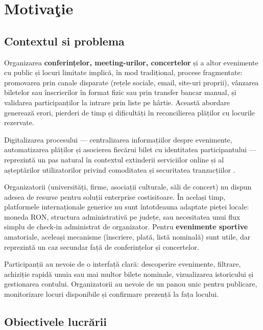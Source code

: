 \chapter{Motiva\c tie}



\section{Contextul si problema}

Organizarea \textbf{conferințelor, meeting-urilor, concertelor} și a altor evenimente cu public și locuri limitate implică, în mod tradițional, procese fragmentate: promovarea prin canale disparate (rețele sociale, email, site-uri proprii), vânzarea biletelor sau înscrierilor în format fizic sau prin transfer bancar manual, și validarea participanților la intrare prin liste pe hârtie. Această abordare generează erori, pierderi de timp și dificultăți în reconcilierea plăților cu locurile rezervate.

Digitalizarea procesului — centralizarea informațiilor despre evenimente, automatizarea plăților și asocierea fiecărui bilet cu identitatea participantului — reprezintă un pas natural în contextul extinderii serviciilor online și al așteptărilor utilizatorilor privind comoditatea și securitatea tranzacțiilor \cite{fielding2000, stripe2024}.

Organizatorii (universități, firme, asociații culturale, săli de concert) nu dispun adesea de resurse pentru soluții enterprise costisitoare. În același timp, platformele internaționale generice nu sunt întotdeauna adaptate pieței locale: moneda RON, structura administrativă pe județe, sau necesitatea unui flux simplu de check-in administrat de organizator. Pentru \textbf{evenimente sportive} amatoriale, aceleași mecanisme (înscriere, plată, listă nominală) sunt utile, dar reprezintă un caz secundar față de conferințelor și concertelor.

Participanții au nevoie de o interfață clară: descoperire evenimente, filtrare, achiziție rapidă unuia sau mai multor bilete nominale, vizualizarea istoricului și gestionarea contului. Organizatorii au nevoie de un panou unic pentru publicare, monitorizare locuri disponibile și confirmare prezență la fața locului.




\section{Obiectivele lucrării}


